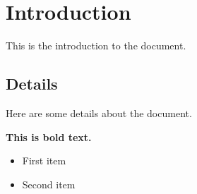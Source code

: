 \documentclass{article}
\begin{document}
\section{Introduction}
This is the introduction to the document.

\subsection{Details}
Here are some details about the document.

\textbf{This is bold text.}

\begin{itemize}
    \item First item
    \item Second item
\end{itemize}

\end{document}
